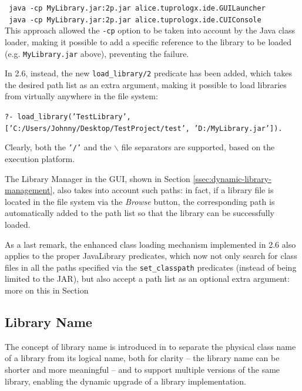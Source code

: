 \noindent \texttt{~java -cp MyLibrary.jar:2p.jar alice.tuprologx.ide.GUILauncher}\\

\noindent \texttt{~java -cp MyLibrary.jar:2p.jar alice.tuprologx.ide.CUIConsole}\\

\noindent This approach allowed the \texttt{-cp} option to be taken into account by the Java class loader, making it possible to add a specific reference to the library to be loaded (e.g. \texttt{MyLibrary.jar} above), preventing the failure.

In \tuprolog{} 2.6, instead, the new \texttt{load\_library/2} predicate has been added, which takes the desired path list as an extra argument, making it possible to load libraries from virtually anywhere in the file system:

\texttt{?- load\_library('TestLibrary',['C:/Users/Johnny/Desktop/TestProject/test', 'D:/MyLibrary.jar']).}

\noindent Clearly, both the \texttt{'/'} and the \texttt{$\backslash$} file separators are supported, based on the execution platform.

The Library Manager in the \tuprolog{} GUI, shown in Section \ref{ssec:dynamic-library-management}, also takes into account such paths: in fact, if a library file is located in the file system via the \textit{Browse} button, the corresponding path is automatically added to the path list so that the library can be successfully loaded.

As a last remark, the enhanced class loading mechanism implemented in \tuprolog{} 2.6 also applies to the proper JavaLibrary predicates, which now not only search for class files in all the paths specified via the \texttt{set\_classpath} predicates (instead of being limited to the \tuprolog{} JAR), but also accept a path list as an optional extra argument: more on this in Section


\subsection{Library Name}
\label{ssec:library-name}

The concept of library name is introduced in \tuprolog{} to separate the physical class name of a library from its logical name, both for clarity -- the library name can be shorter and more meaningful -- and to support multiple versions of the same library, enabling the dynamic upgrade of a library implementation.

